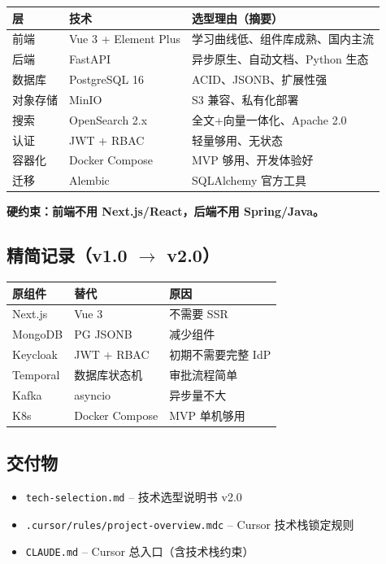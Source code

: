 \documentclass[11pt,a4paper]{article}
\begin{document}
\begin{table}[h]
\centering
\begin{tabular}{llp{5.5cm}}
\toprule
\textbf{层} & \textbf{技术} & \textbf{选型理由（摘要）} \\
\midrule
前端 & Vue 3 + Element Plus & 学习曲线低、组件库成熟、国内主流 \\
后端 & FastAPI & 异步原生、自动文档、Python 生态 \\
数据库 & PostgreSQL 16 & ACID、JSONB、扩展性强 \\
对象存储 & MinIO & S3 兼容、私有化部署 \\
搜索 & OpenSearch 2.x & 全文+向量一体化、Apache 2.0 \\
认证 & JWT + RBAC & 轻量够用、无状态 \\
容器化 & Docker Compose & MVP 够用、开发体验好 \\
迁移 & Alembic & SQLAlchemy 官方工具 \\
\bottomrule
\end{tabular}
\end{table}

\textbf{硬约束：前端不用 Next.js/React，后端不用 Spring/Java。}

\subsection{精简记录（v1.0 $\to$ v2.0）}

\begin{table}[h]
\centering
\begin{tabular}{llp{4.5cm}}
\toprule
\textbf{原组件} & \textbf{替代} & \textbf{原因} \\
\midrule
Next.js & Vue 3 & 不需要 SSR \\
MongoDB & PG JSONB & 减少组件 \\
Keycloak & JWT + RBAC & 初期不需要完整 IdP \\
Temporal & 数据库状态机 & 审批流程简单 \\
Kafka & asyncio & 异步量不大 \\
K8s & Docker Compose & MVP 单机够用 \\
\bottomrule
\end{tabular}
\end{table}

\subsection{交付物}

\begin{itemize}[nosep]
  \item \texttt{tech-selection.md} -- 技术选型说明书 v2.0
  \item \texttt{.cursor/rules/project-overview.mdc} -- Cursor 技术栈锁定规则
  \item \texttt{CLAUDE.md} -- Cursor 总入口（含技术栈约束）
\end{itemize}
\end{document}
